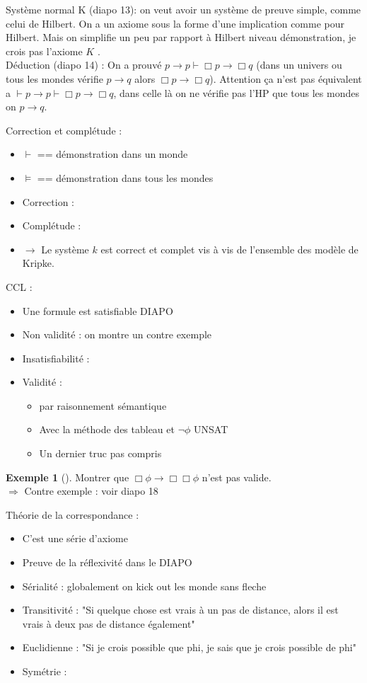 \documentclass{article}
\theoremstyle{plain}%
\theoremstyle{definition}
\newtheorem{exmp}{Exemple}[section]
\theoremstyle{remark}
\begin{document}
Système normal K (diapo 13): on veut avoir un système de preuve simple, comme celui de Hilbert. On a un axiome sous la forme d'une implication comme pour Hilbert. Mais on simplifie un peu par rapport à Hilbert niveau démonstration, je crois pas l'axiome $ K $ . \\
Déduction (diapo 14) : On a prouvé $ p \rightarrow p \vdash \Box p \rightarrow \Box q $ (dans un univers ou tous les mondes vérifie $ p \rightarrow q $ alors $ \Box p \rightarrow \Box q $). Attention ça n'est pas équivalent a $ \vdash p \rightarrow p \vdash \Box p \rightarrow \Box q$, dans celle là on ne vérifie pas l'HP que tous les mondes on $ p \rightarrow q $. 

Correction et complétude : 
\begin{itemize}
    \item $ \vdash  $ == démonstration dans un monde
    \item $ \models  $ == démonstration dans tous les mondes
    \item Correction : 
    \item Complétude :
    \item $\rightarrow$ Le système $ k $ est correct et complet vis à vis de l'ensemble des modèle de Kripke. 
\end{itemize}

CCL : 
\begin{itemize}
    \item Une formule est satisfiable DIAPO
    \item Non validité : on montre un contre exemple
    \item Insatisfiabilité : 
    \item Validité : \begin{itemize}
        \item par raisonnement sémantique
        \item Avec la méthode des tableau et $ \lnot \phi  $ UNSAT
        \item Un dernier truc pas compris
    \end{itemize}
\end{itemize}

\begin{exmp}[]
    Montrer que $ \Box \phi \rightarrow \Box \Box \phi  $ n'est pas valide. \\
    $\Rightarrow$ Contre exemple : voir diapo 18
\end{exmp}

Théorie de la correspondance : 
\begin{itemize}
    \item C'est une série d'axiome 
    \item Preuve de la réflexivité dans le DIAPO
    \item Sérialité : globalement on kick out les monde sans fleche 
    \item Transitivité : "Si quelque chose est vrais à un pas de distance, alors il est vrais à deux pas de distance également"
    \item Euclidienne : "Si je crois possible que phi, je sais que je crois possible de phi"
    \item Symétrie : 
\end{itemize}
\end{document}
